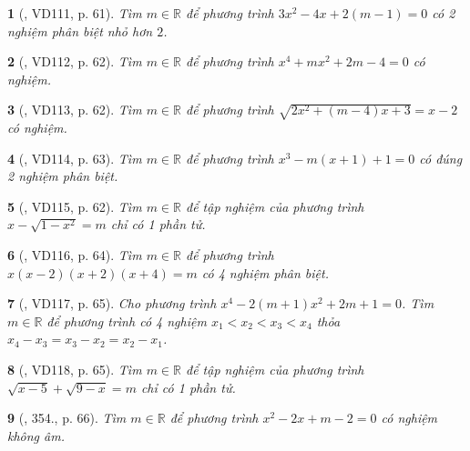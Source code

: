 \documentclass{article}
\newtheorem{baitoan}{}
\begin{document}
\begin{baitoan}[\cite{Binh_Toan_9_tap_2}, VD111, p. 61]
	Tìm $m\in\mathbb{R}$ để phương trình $3x^2 - 4x + 2(m - 1) = 0$ có 2 nghiệm phân biệt nhỏ hơn $2$.
\end{baitoan}

\begin{baitoan}[\cite{Binh_Toan_9_tap_2}, VD112, p. 62]
	Tìm $m\in\mathbb{R}$ để phương trình $x^4 + mx^2 + 2m - 4 = 0$ có nghiệm.
\end{baitoan}

\begin{baitoan}[\cite{Binh_Toan_9_tap_2}, VD113, p. 62]
	Tìm $m\in\mathbb{R}$ để phương trình $\sqrt{2x^2 + (m - 4)x + 3} = x - 2$ có nghiệm.
\end{baitoan}

\begin{baitoan}[\cite{Binh_Toan_9_tap_2}, VD114, p. 63]
	Tìm $m\in\mathbb{R}$ để phương trình $x^3 - m(x + 1) + 1 = 0$ có đúng 2 nghiệm phân biệt.
\end{baitoan}

\begin{baitoan}[\cite{Binh_Toan_9_tap_2}, VD115, p. 62]
	Tìm $m\in\mathbb{R}$ để tập nghiệm của phương trình $x - \sqrt{1 - x^2} = m$ chỉ có 1 phần tử.
\end{baitoan}

\begin{baitoan}[\cite{Binh_Toan_9_tap_2}, VD116, p. 64]
	Tìm $m\in\mathbb{R}$ để phương trình $x(x - 2)(x + 2)(x + 4) = m$ có 4 nghiệm phân biệt.
\end{baitoan}

\begin{baitoan}[\cite{Binh_Toan_9_tap_2}, VD117, p. 65]
	Cho phương trình $x^4 - 2(m + 1)x^2 + 2m + 1 = 0$. Tìm $m\in\mathbb{R}$ để phương trình có 4 nghiệm $x_1 < x_2 < x_3 < x_4$ thỏa $x_4 - x_3 = x_3 - x_2 = x_2 - x_1$.
\end{baitoan}

\begin{baitoan}[\cite{Binh_Toan_9_tap_2}, VD118, p. 65]
	Tìm $m\in\mathbb{R}$ để tập nghiệm của phương trình $\sqrt{x - 5} + \sqrt{9 - x} = m$ chỉ có 1 phần tử.
\end{baitoan}

\begin{baitoan}[\cite{Binh_Toan_9_tap_2}, 354., p. 66]
	Tìm $m\in\mathbb{R}$ để phương trình $x^2 - 2x + m - 2 = 0$ có nghiệm không âm.
\end{baitoan}
\end{document}
